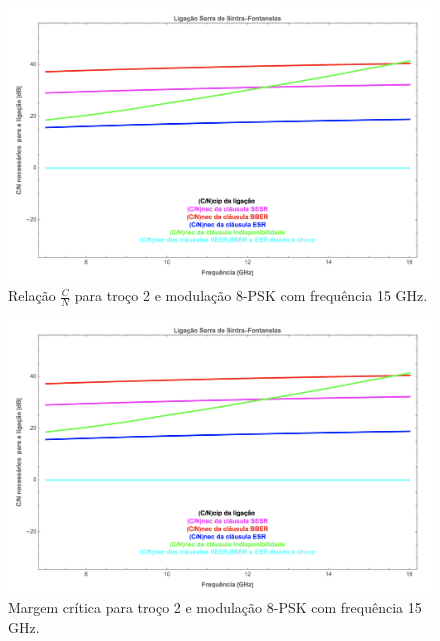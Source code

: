 \begin{figure}[H]
\centering
\includegraphics[scale=0.4]{cn_s_f.png}
\caption{Relação $\frac{C}{N}$ para troço 2 e modulação 8-PSK com frequência 15 GHz.}
\end{figure}

\begin{figure}[H]
\centering
\includegraphics[scale=0.4]{cn_s_f.png}
\caption{Margem crítica para troço 2 e modulação 8-PSK com frequência 15 GHz.}
\end{figure}
 
